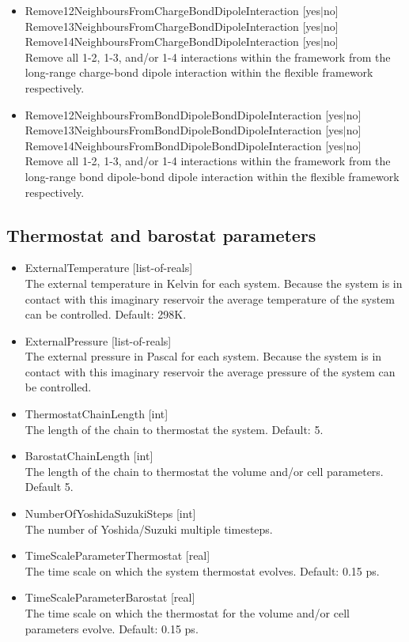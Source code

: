 \begin{itemize}
\item{Remove12NeighboursFromChargeBondDipoleInteraction [yes$|$no]\\
      Remove13NeighboursFromChargeBondDipoleInteraction [yes$|$no]\\
      Remove14NeighboursFromChargeBondDipoleInteraction [yes$|$no]}\\
Remove all 1-2, 1-3, and/or 1-4 interactions within the framework from the long-range charge-bond dipole
interaction within the flexible framework respectively.
\item{Remove12NeighboursFromBondDipoleBondDipoleInteraction [yes$|$no]\\
      Remove13NeighboursFromBondDipoleBondDipoleInteraction [yes$|$no]\\
      Remove14NeighboursFromBondDipoleBondDipoleInteraction [yes$|$no]}\\
Remove all 1-2, 1-3, and/or 1-4 interactions within the framework from the long-range bond dipole-bond dipole
interaction within the flexible framework respectively.
\end{itemize}

\subsection*{Thermostat and barostat parameters}
\begin{itemize}
\item{ExternalTemperature [list-of-reals]}\\
The external temperature in Kelvin for each system. Because the system is in contact with this imaginary reservoir the
average temperature of the system can be controlled. Default: 298K.
\item{ExternalPressure [list-of-reals]}\\
The external pressure in Pascal for each system. Because the system is in contact with this imaginary reservoir the
average pressure of the system can be controlled. 
\item{ThermostatChainLength [int]}\\
The length of the chain to thermostat the system. Default: 5.
\item{BarostatChainLength [int]}\\
The length of the chain to thermostat the volume and/or cell parameters. Default 5.
\item{NumberOfYoshidaSuzukiSteps [int]}\\
The number of Yoshida/Suzuki multiple timesteps.
\item{TimeScaleParameterThermostat [real]}\\
The time scale on which the system thermostat evolves. Default: 0.15 ps.
\item{TimeScaleParameterBarostat [real]}\\
The time scale on which the thermostat for the volume and/or cell parameters evolve. Default: 0.15 ps.
\end{itemize}

